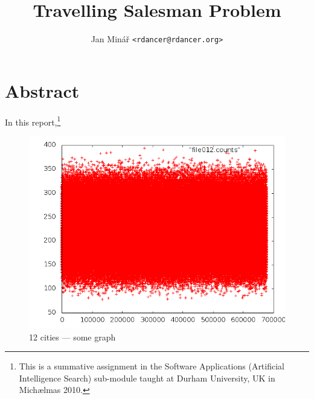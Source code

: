 \documentclass[10pt,twocolumn]{article}
\author{Jan Minář {\tt <rdancer@rdancer.org>}}
\title{Travelling Salesman Problem}
\begin{document}

\setcounter{section}{-1}  %

\maketitle



\section{Abstract}
\thispagestyle{fancy}

In this report,\footnote{This is a summative assignment in the Software Applications (Artificial Intelligence Search) sub-module taught at Durham University, UK in Michælmas 2010.}

\begin{figure}

	    \includegraphics[width=0.3\paperwidth]{file012.png}

    \caption{
	12 cities --- some graph
    }
    \label{file012}
\end{figure}



\pagebreak

\nocite{*}  %


\thispagestyle{fancy}
\end{document}
